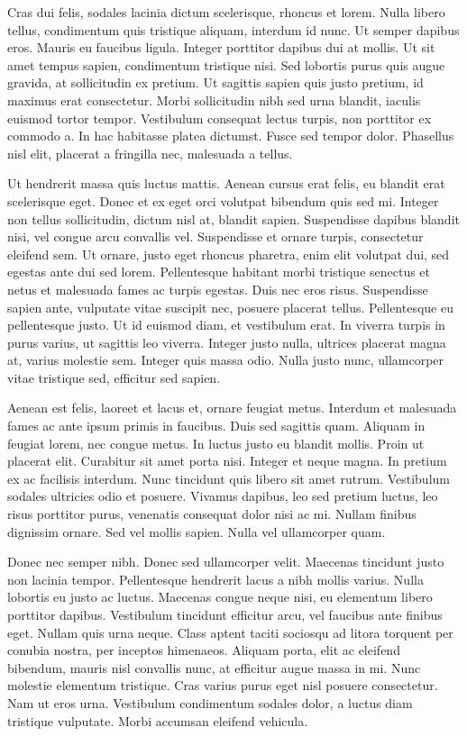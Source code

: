 Cras dui felis, sodales lacinia dictum scelerisque, rhoncus et lorem. Nulla libero tellus, condimentum quis tristique aliquam, interdum id nunc. Ut semper dapibus eros. Mauris eu faucibus ligula. Integer porttitor dapibus dui at mollis. Ut sit amet tempus sapien, condimentum tristique nisi. Sed lobortis purus quis augue gravida, at sollicitudin ex pretium. Ut sagittis sapien quis justo pretium, id maximus erat consectetur. Morbi sollicitudin nibh sed urna blandit, iaculis euismod tortor tempor. Vestibulum consequat lectus turpis, non porttitor ex commodo a. In hac habitasse platea dictumst. Fusce sed tempor dolor. Phasellus nisl elit, placerat a fringilla nec, malesuada a tellus.

Ut hendrerit massa quis luctus mattis. Aenean cursus erat felis, eu blandit erat scelerisque eget. Donec et ex eget orci volutpat bibendum quis sed mi. Integer non tellus sollicitudin, dictum nisl at, blandit sapien. Suspendisse dapibus blandit nisi, vel congue arcu convallis vel. Suspendisse et ornare turpis, consectetur eleifend sem. Ut ornare, justo eget rhoncus pharetra, enim elit volutpat dui, sed egestas ante dui sed lorem. Pellentesque habitant morbi tristique senectus et netus et malesuada fames ac turpis egestas. Duis nec eros risus. Suspendisse sapien ante, vulputate vitae suscipit nec, posuere placerat tellus. Pellentesque eu pellentesque justo. Ut id euismod diam, et vestibulum erat. In viverra turpis in purus varius, ut sagittis leo viverra. Integer justo nulla, ultrices placerat magna at, varius molestie sem. Integer quis massa odio. Nulla justo nunc, ullamcorper vitae tristique sed, efficitur sed sapien.

Aenean est felis, laoreet et lacus et, ornare feugiat metus. Interdum et malesuada fames ac ante ipsum primis in faucibus. Duis sed sagittis quam. Aliquam in feugiat lorem, nec congue metus. In luctus justo eu blandit mollis. Proin ut placerat elit. Curabitur sit amet porta nisi. Integer et neque magna. In pretium ex ac facilisis interdum. Nunc tincidunt quis libero sit amet rutrum. Vestibulum sodales ultricies odio et posuere. Vivamus dapibus, leo sed pretium luctus, leo risus porttitor purus, venenatis consequat dolor nisi ac mi. Nullam finibus dignissim ornare. Sed vel mollis sapien. Nulla vel ullamcorper quam.

Donec nec semper nibh. Donec sed ullamcorper velit. Maecenas tincidunt justo non lacinia tempor. Pellentesque hendrerit lacus a nibh mollis varius. Nulla lobortis eu justo ac luctus. Maecenas congue neque nisi, eu elementum libero porttitor dapibus. Vestibulum tincidunt efficitur arcu, vel faucibus ante finibus eget. Nullam quis urna neque. Class aptent taciti sociosqu ad litora torquent per conubia nostra, per inceptos himenaeos. Aliquam porta, elit ac eleifend bibendum, mauris nisl convallis nunc, at efficitur augue massa in mi. Nunc molestie elementum tristique. Cras varius purus eget nisl posuere consectetur. Nam ut eros urna. Vestibulum condimentum sodales dolor, a luctus diam tristique vulputate. Morbi accumsan eleifend vehicula.

